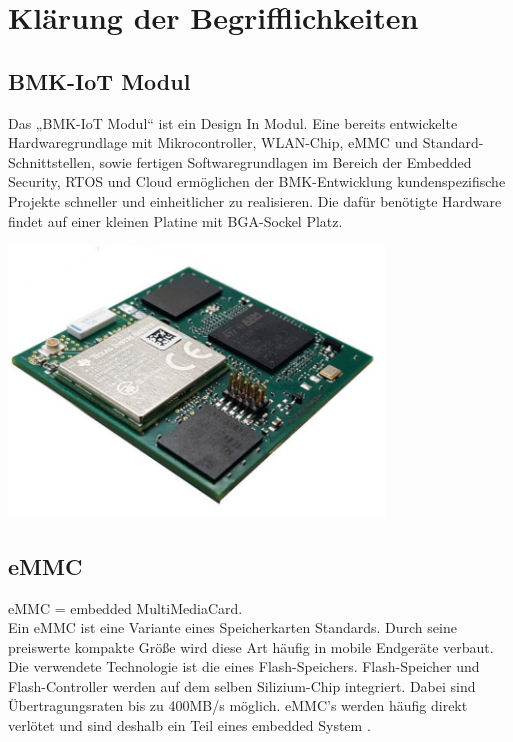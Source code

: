 

\section{Klärung der Begrifflichkeiten}

\subsection{BMK-IoT Modul}
Das „BMK-IoT Modul“ ist ein Design In Modul. Eine bereits entwickelte Hardwaregrundlage mit Mikrocontroller, WLAN-Chip, eMMC und Standard-Schnittstellen, sowie fertigen Softwaregrundlagen im Bereich der Embedded Security, RTOS und Cloud ermöglichen der BMK-Entwicklung kundenspezifische Projekte schneller und einheitlicher zu realisieren.
Die dafür benötigte Hardware findet auf einer kleinen Platine mit BGA-Sockel Platz. 

\begin{center}
\includegraphics[width=10cm]{Bilder/BMK-IOT-MODUL.png}
\end{center}

\subsection{eMMC}
eMMC = embedded MultiMediaCard.
\\
Ein \glqq eMMC \grqq{} ist eine Variante eines Speicherkarten Standards. Durch seine preiswerte kompakte Größe wird diese Art häufig in mobile Endgeräte verbaut. Die verwendete Technologie ist die eines Flash-Speichers. Flash-Speicher und Flash-Controller werden auf dem selben Silizium-Chip integriert. Dabei sind Übertragungsraten bis zu 400MB/s möglich. eMMC's werden häufig direkt verlötet und sind deshalb ein Teil eines \glqq embedded System \grqq{}.


